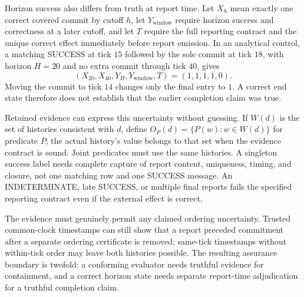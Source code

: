 \documentclass[11pt]{article}
\begin{document}
Horizon success also differs from truth at report time. Let $X_h$ mean exactly one correct covered commit by cutoff $h$, let $Y_{\mathrm{window}}$ require horizon success and correctness at a later cutoff, and let $T$ require the full reporting contract and the unique correct effect immediately before report emission. In an analytical control, a matching SUCCESS at tick $15$ followed by the sole commit at tick $18$, with horizon $H=20$ and no extra commit through tick $40$, gives \[(X_{20},X_{40},Y_H,Y_{\mathrm{window}},T)=(1,1,1,1,0).\] Moving the commit to tick $14$ changes only the final entry to $1$. A correct end state therefore does not establish that the earlier completion claim was true.

Retained evidence can express this uncertainty without guessing. If $W(d)$ is the set of histories consistent with $d$, define $O_P(d)=\{P(w):w\in W(d)\}$ for predicate $P$; the actual history's value belongs to that set when the evidence contract is sound. Joint predicates must use the same histories. A singleton success label needs complete capture of report content, uniqueness, timing, and closure, not one matching row and one SUCCESS message. An INDETERMINATE, late SUCCESS, or multiple final reports fails the specified reporting contract even if the external effect is correct.

The evidence must genuinely permit any claimed ordering uncertainty. Trusted common-clock timestamps can still show that a report preceded commitment after a separate ordering certificate is removed; same-tick timestamps without within-tick order may leave both histories possible. The resulting assurance boundary is twofold: a conforming evaluator needs truthful evidence for containment, and a correct horizon state needs separate report-time adjudication for a truthful completion claim.
\end{document}

